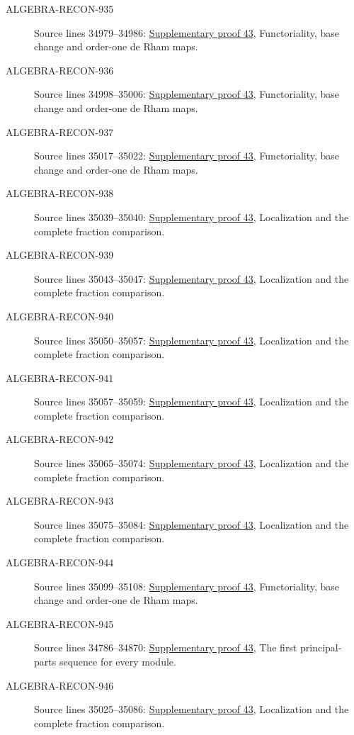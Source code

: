 \begin{description}
\item[ALGEBRA-RECON-935] Source lines 34979--34986: \hyperlink{algebra_diff_operators_notes_20260928}{Supplementary proof 43}, Functoriality, base change and order-one de Rham maps.
\item[ALGEBRA-RECON-936] Source lines 34998--35006: \hyperlink{algebra_diff_operators_notes_20260928}{Supplementary proof 43}, Functoriality, base change and order-one de Rham maps.
\item[ALGEBRA-RECON-937] Source lines 35017--35022: \hyperlink{algebra_diff_operators_notes_20260928}{Supplementary proof 43}, Functoriality, base change and order-one de Rham maps.
\item[ALGEBRA-RECON-938] Source lines 35039--35040: \hyperlink{algebra_diff_operators_notes_20260928}{Supplementary proof 43}, Localization and the complete fraction comparison.
\item[ALGEBRA-RECON-939] Source lines 35043--35047: \hyperlink{algebra_diff_operators_notes_20260928}{Supplementary proof 43}, Localization and the complete fraction comparison.
\item[ALGEBRA-RECON-940] Source lines 35050--35057: \hyperlink{algebra_diff_operators_notes_20260928}{Supplementary proof 43}, Localization and the complete fraction comparison.
\item[ALGEBRA-RECON-941] Source lines 35057--35059: \hyperlink{algebra_diff_operators_notes_20260928}{Supplementary proof 43}, Localization and the complete fraction comparison.
\item[ALGEBRA-RECON-942] Source lines 35065--35074: \hyperlink{algebra_diff_operators_notes_20260928}{Supplementary proof 43}, Localization and the complete fraction comparison.
\item[ALGEBRA-RECON-943] Source lines 35075--35084: \hyperlink{algebra_diff_operators_notes_20260928}{Supplementary proof 43}, Localization and the complete fraction comparison.
\item[ALGEBRA-RECON-944] Source lines 35099--35108: \hyperlink{algebra_diff_operators_notes_20260928}{Supplementary proof 43}, Functoriality, base change and order-one de Rham maps.
\item[ALGEBRA-RECON-945] Source lines 34786--34870: \hyperlink{algebra_diff_operators_notes_20260928}{Supplementary proof 43}, The first principal-parts sequence for every module.
\item[ALGEBRA-RECON-946] Source lines 35025--35086: \hyperlink{algebra_diff_operators_notes_20260928}{Supplementary proof 43}, Localization and the complete fraction comparison.

\end{description}
